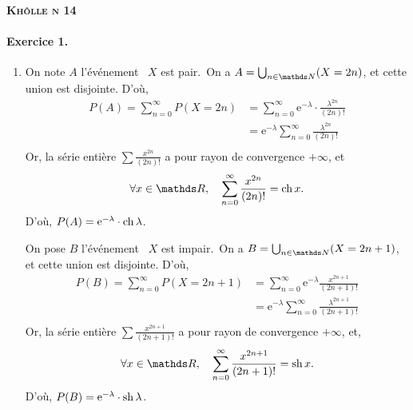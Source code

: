 \documentclass[a4paper]{article}
\def\khollenum{14}
\begin{document}
	\begin{center}
		\bfseries\scshape\Huge Khôlle n \khollenum
	\end{center}

	\paragraph{Exercice 1.}
	\begin{enumerate}
		\item On note $A$\/ l'événement \guillemotleft~$X$\/ est pair.~\guillemotright\@ On a $A = \bigcup_{n \in \N} (X = 2n)$, et cette union est disjointe. D'où,
			\begin{align*}
				P(A) = \sum_{n = 0}^\infty P(X = 2n) &= \sum_{n=0}^\infty \mathrm{e}^{-\lambda} \cdot \frac{\lambda^{2n}}{(2n)!} \\
				&= \mathrm{e}^{-\lambda} \sum_{n=0}^\infty \frac{\lambda^{2n}}{(2n)!} \\
			\end{align*}
			Or, la série entière $\sum \frac{x^{2n}}{(2n)!}$\/ a pour rayon de convergence $+\infty$, et \[
				\forall x \in \R,\quad \sum_{n=0}^\infty \frac{x^{2n}}{(2n)!} = \ch x
			.\] D'où, $P(A) = \mathrm{e}^{-\lambda} \cdot \operatorname{ch} \lambda$.

			On pose $B$\/ l'événement \guillemotleft~$X$\/ est impair.~\guillemotright\@ On a $B = \bigcup_{n \in \N} (X = 2n+1)$, et cette union est disjointe. D'où,
			\begin{align*}
				P(B) = \sum_{n=0}^\infty P(X = 2n+1) &= \sum_{n=0}^\infty \mathrm{e}^{-\lambda} \frac{x^{2n+1}}{(2n+1)!} \\
				&= \mathrm{e}^{-\lambda}\sum_{n=0}^\infty \frac{\lambda^{2n+1}}{(2n+1)!} \\
			\end{align*}
			Or, la série entière $\sum \frac{x^{2n+1}}{(2n+1)!}$\/ a pour rayon de convergence $+\infty$, et, \[
				\forall x \in \R, \quad \sum_{n=0}^\infty \frac{x^{2n+1}}{(2n+1)!} = \sh x
			.\] D'où, $P(B) = \mathrm{e}^{-\lambda} \cdot \operatorname{sh} \lambda$.


\end{enumerate}
\end{document}

